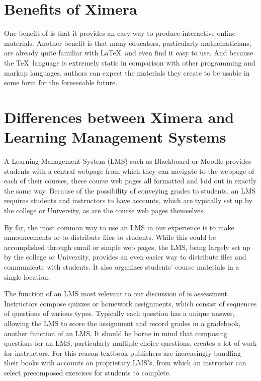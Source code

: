 \documentclass{ximera}
\begin{document}
\section{Benefits of Ximera}
One benefit of  is that it provides an easy way to produce interactive online materials.
Another benefit is that many educators, particularly mathematicians, are already quite familiar with \LaTeX\ and
even find it easy to use. 
And because the \TeX\ language is extremely static in comparison with other programming and markup languages, authors can expect the  materials they create to be usable in some form for the foreseeable future.

\section{Differences between Ximera and Learning Management Systems}

A Learning Management System (LMS) such as Blackboard or Moodle provides students with a central webpage from
which they can navigate to the webpage of each of their courses, these course web pages all formatted and laid out in exactly the same way.
Because of the possibility of conveying grades to students, an LMS requires students and instructors to have accounts,
which are typically set up by the college or University, as are the course web pages themselves.

By far, the most common way to use an LMS in our experience is to make announcements or to distribute files to students.  While this could be accomplished through email or simple web pages, the LMS, being largely set up by the college or University, provides an even easier way to distribute files and communicate with students.
It also organizes students' course materials in a single location.

The function of an LMS most relevant to our discussion of  is assessment.
Instructors compose quizzes or homework assignments, which consist of sequences of questions of various types.
Typically each question has a unique answer, allowing the LMS to score the assignment and record grades in a
gradebook, another function of an LMS.
It should be borne in mind that composing questions for an LMS, particularly multiple-choice questions, creates a lot of work
for instructors. 
For this reason textbook publishers are increasingly bundling their books with accounts
on proprietary LMS's, from which an instructor can select precomposed exercises for students to complete.
\end{document}
